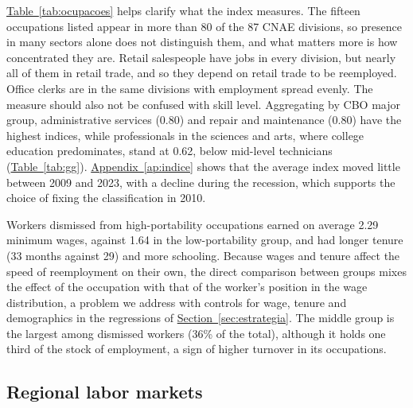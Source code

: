\documentclass[11pt,a4paper]{article}
\begin{document}
\hyperref[tab:ocupacoes]{Table~\ref*{tab:ocupacoes}} helps clarify what the index measures. The fifteen occupations listed appear in more than 80 of the 87 CNAE divisions, so presence in many sectors alone does not distinguish them, and what matters more is how concentrated they are. Retail salespeople have jobs in every division, but nearly all of them in retail trade, and so they depend on retail trade to be reemployed. Office clerks are in the same divisions with employment spread evenly. The measure should also not be confused with skill level. Aggregating by CBO major group, administrative services (0.80) and repair and maintenance (0.80) have the highest indices, while professionals in the sciences and arts, where college education predominates, stand at 0.62, below mid-level technicians (\hyperref[tab:gg]{Table~\ref*{tab:gg}}). \hyperref[ap:indice]{Appendix~\ref*{ap:indice}} shows that the average index moved little between 2009 and 2023, with a decline during the recession, which supports the choice of fixing the classification in 2010.

\begin{table}[!htb]
\centering
\caption{Largest occupations in each portability group, 2010}
\label{tab:ocupacoes}

\end{table}

Workers dismissed from high-portability occupations earned on average 2.29 minimum wages, against 1.64 in the low-portability group, and had longer tenure (33 months against 29) and more schooling. Because wages and tenure affect the speed of reemployment on their own, the direct comparison between groups mixes the effect of the occupation with that of the worker's position in the wage distribution, a problem we address with controls for wage, tenure and demographics in the regressions of \hyperref[sec:estrategia]{Section~\ref*{sec:estrategia}}. The middle group is the largest among dismissed workers (36\% of the total), although it holds one third of the stock of employment, a sign of higher turnover in its occupations.

\begin{table}[!htb]
\centering
\caption{Characteristics of dismissed workers by portability group}
\label{tab:perfil}

\end{table}

\subsection{Regional labor markets}
\label{sec:regioes}
\end{document}
